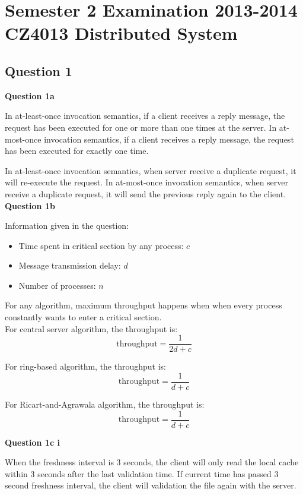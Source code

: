 \documentclass[11pt,a4paper]{report}
\begin{document}
\chapter{Semester 2 Examination 2013-2014\\CZ4013 Distributed System}

\begin{multicols*}{2}

\section{Question 1}

\noindent \textbf{Question 1a}

\noindent In at-least-once invocation semantics, if a client receives a reply message, the request has been executed for one or more than one times at the server. In at-most-once invocation semantics, if a client receives a reply message, the request has been executed for exactly one time. 

\noindent In at-least-once invocation semantics, when server receive a duplicate request, it will re-execute the request. In at-most-once invocation semantics, when server receive a duplicate request, it will send the previous reply again to the client.\\

\noindent \textbf{Question 1b}

\noindent Information given in the question:
\begin{itemize}
  \item Time spent in critical section by any process: $c$
  \item Message transmission delay: $d$
  \item Number of processes: $n$
\end{itemize}

\noindent For any algorithm, maximum throughput happens when when every process constantly wants to enter a critical section.\\

\noindent For central server algorithm, the throughput is:
$$\text{throughput}=\frac{1}{2d + c}$$

\noindent For ring-based algorithm, the throughput is:
$$\text{throughput}=\frac{1}{d + c}$$

\noindent For Ricart-and-Agrawala algorithm, the throughput is:
$$\text{throughput}=\frac{1}{d + c}$$

\noindent \textbf{Question 1c i}

\noindent When the freshness interval is 3 seconds, the client will only read the local cache within 3 seconds after the last validation time. If current time has passed 3 second freshness interval, the client will validation the file again with the server.\\


\end{multicols*}
\end{document}
